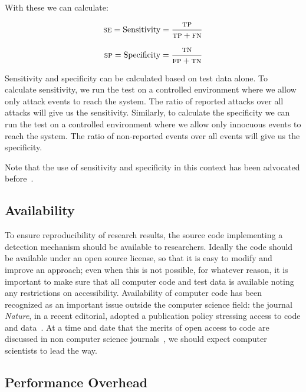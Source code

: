 \documentclass[10pt,journal,compsoc]{IEEEtran}
\begin{document}
\noindent
With these we can calculate:

\begin{equation}
  \textsc{se} = \textrm{Sensitivity} = \frac{\textsc{tp}}{\textsc{tp}
    + \textsc{fn}}
\label{eq:sensitivity}
\end{equation}

\begin{equation}
  \textsc{sp} = \textrm{Specificity} = \frac{\textsc{tn}}{\textsc{fp}
    + \textsc{tn}}
\label{eq:specificity}
\end{equation}

\noindent
Sensitivity and specificity can be calculated based on test
data alone. To calculate sensitivity, we run the test on a
controlled environment where we allow only attack events to reach the
system. The ratio of reported attacks over all attacks will give us
the sensitivity. Similarly, to calculate the specificity we can run
the test on a controlled environment where we allow only innocuous
events to reach the system. The ratio of non-reported events over all
events will give us the specificity.

Note that the use of sensitivity and specificity in this context
has been advocated before~\cite{PP12}.

\subsection{Availability}

To ensure reproducibility of research results, the source code
implementing a detection mechanism should be available to researchers.
Ideally the code should be available under an open source license, so
that it is easy to modify and improve an approach; even when this is
not possible, for whatever reason, it is important to make sure that
all computer code and test data is available noting any restrictions
on accessibility. Availability of computer code has been recognized as
an important issue outside the computer science field: the journal
\emph{Nature}, in a recent editorial, adopted a publication policy stressing
access to code and data~\cite{nature2014}. At a time and date that the
merits of open access to code are discussed in non computer science
journals~\cite{easterbrook2014}, we should expect computer scientists
to lead the way.
 
\subsection{Performance Overhead}
\end{document}
